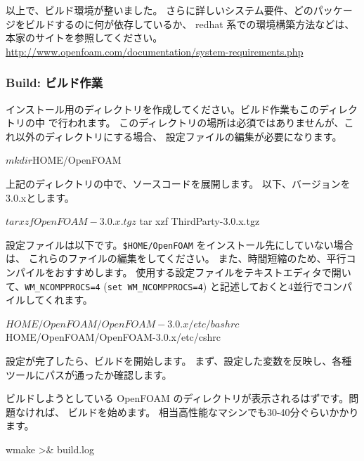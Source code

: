 \documentclass[mingoth,a4paper]{jsarticle}
\begin{document}
以上で、ビルド環境が整いました。
さらに詳しいシステム要件、どのパッケージをビルドするのに何が依存しているか、
redhat 系での環境構築方法などは、本家のサイトを参照してください。
\url{http://www.openfoam.com/documentation/system-requirements.php}

\subsubsection{Build: ビルド作業}
インストール用のディレクトリを作成してください。ビルド作業もこのディレクトリの中
で行われます。
このディレクトリの場所は必須ではありませんが、これ以外のディレクトリにする場合、
設定ファイルの編集が必要になります。

\begin{commandline}
$ mkdir $HOME/OpenFOAM
\end{commandline}

上記のディレクトリの中で、ソースコードを展開します。
以下、バージョンを3.0.xとします。

\begin{commandline}
$ tar xzf OpenFOAM-3.0.x.tgz
$ tar xzf ThirdParty-3.0.x.tgz
\end{commandline}

設定ファイルは以下です。\verb|$HOME/OpenFOAM| をインストール先にしていない場合は、
これらのファイルの編集をしてください。
また、時間短縮のため、平行コンパイルをおすすめします。
使用する設定ファイルをテキストエディタで開いて、\verb|WM_NCOMPPROCS=4| (\verb|set WM_NCOMPPROCS=4|)
と記述しておくと4並行でコンパイルしてくれます。

\begin{commandline}
$HOME/OpenFOAM/OpenFOAM-3.0.x/etc/bashrc
$HOME/OpenFOAM/OpenFOAM-3.0.x/etc/cshrc
\end{commandline}

設定が完了したら、ビルドを開始します。
まず、設定した変数を反映し、各種ツールにパスが通ったか確認します。


ビルドしようとしている OpenFOAM のディレクトリが表示されるはずです。問題なければ、
ビルドを始めます。
相当高性能なマシンでも30-40分ぐらいかかります。

\begin{commandline}
wmake >& build.log
\end{commandline}
\end{document}
